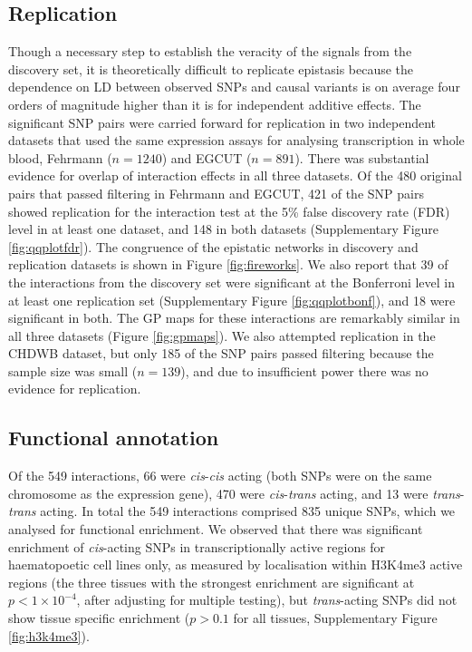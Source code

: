 \documentclass{article}
\begin{document}
\subsection{Replication}
Though a necessary step to establish the veracity of the signals from the discovery set, it is theoretically difficult to replicate epistasis because the dependence on LD between observed SNPs and causal variants is on average four orders of magnitude higher than it is for independent additive effects. The significant SNP pairs were carried forward for replication in two independent datasets that used the same expression assays for analysing transcription in whole blood, Fehrmann ($n=1240$) and EGCUT ($n=891$). There was substantial evidence for overlap of interaction effects in all three datasets. Of the 480 original pairs that passed filtering in Fehrmann and EGCUT, 421 of the SNP pairs showed replication for the interaction test at the 5\% false discovery rate (FDR) level in at least one dataset, and 148 in both datasets (Supplementary Figure \ref{fig:qqplotfdr}). The congruence of the epistatic networks in discovery and replication datasets is shown in Figure \ref{fig:fireworks}. We also report that 39 of the interactions from the discovery set were significant at the Bonferroni level in at least one replication set (Supplementary Figure \ref{fig:qqplotbonf}), and 18 were significant in both. The GP maps for these interactions are remarkably similar in all three datasets (Figure \ref{fig:gpmaps}). We also attempted replication in the CHDWB dataset, but only 185 of the SNP pairs passed filtering because the sample size was small ($n=139$), and due to insufficient power there was no evidence for replication.


\subsection{Functional annotation}
Of the 549 interactions, 66 were \emph{cis}-\emph{cis} acting (both SNPs were on the same chromosome as the expression gene), 470 were \emph{cis}-\emph{trans} acting, and 13 were \emph{trans}-\emph{trans} acting. In total the 549 interactions comprised 835 unique SNPs, which we analysed for functional enrichment. We observed that there was significant enrichment of \emph{cis}-acting SNPs in transcriptionally active regions for haematopoetic cell lines only, as measured by localisation within H3K4me3 active regions (the three tissues with the strongest enrichment are significant at $p < 1 \times 10^{-4}$, after adjusting for multiple testing), but \emph{trans}-acting SNPs did not show tissue specific enrichment ($p > 0.1$ for all tissues, Supplementary Figure \ref{fig:h3k4me3}). 
\end{document}
